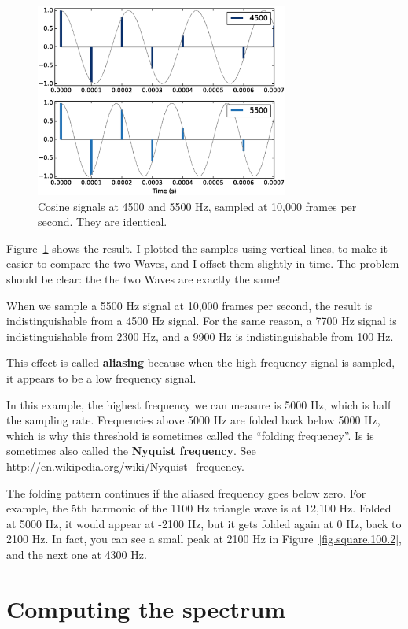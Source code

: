 \documentclass[12pt]{book}
\begin{document}
\begin{figure}
\centerline{\includegraphics[height=2.5in]{figs/aliasing1.eps}}
\caption{Cosine signals at 4500 and 5500 Hz, sampled at 10,000 frames
per second.  They are identical.}
\label{fig.aliasing1}
\end{figure}

Figure~\ref{fig.aliasing1} shows the result.  I plotted the
samples using vertical lines, to make it easier to compare the
two Waves, and I offset them slightly in time.  The problem
should be clear: the
the two Waves are exactly the same!

When we sample a 5500 Hz signal at 10,000 frames per second, the
result is indistinguishable from a 4500 Hz signal.
For the same reason, a 7700 Hz signal is indistinguishable
from 2300 Hz, and a 9900 Hz is indistinguishable from 100 Hz.

This effect is called {\bf aliasing} because when the high frequency
signal is sampled, it appears to be a low frequency signal.

In this example, the highest frequency we can measure is 5000 Hz,
which is half the sampling rate.  Frequencies above 5000 Hz are folded
back below 5000 Hz, which is why this threshold is sometimes called
the ``folding frequency''.  Is is sometimes also called the {\bf
  Nyquist frequency}.  See
\url{http://en.wikipedia.org/wiki/Nyquist_frequency}.

The folding pattern continues if the aliased frequency goes below
zero.  For example, the 5th harmonic of the 1100 Hz triangle wave is
at 12,100 Hz.  Folded at 5000 Hz, it would appear at -2100 Hz, but it
gets folded again at 0 Hz, back to 2100 Hz.  In fact, you can see a
small peak at 2100 Hz in Figure~\ref{fig.square.100.2}, and the next
one at 4300 Hz.


\section{Computing the spectrum}
\end{document}
